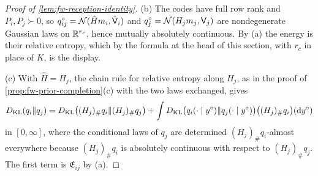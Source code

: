 \begin{proof}[Proof of \cref{lem:fw-reception-identity}]
(b) The codes have full row rank and $P_i,P_j\succ0$, so $q^\circ_{ij}=\mathcal{N}(\hat Hm_i,\hat{\mathsf V}_i)$ and $q^\circ_j=\mathcal{N}(H_jm_j,\mathsf V_j)$ are nondegenerate Gaussian laws on $\mathbb{R}^{r_c}$, hence mutually absolutely continuous. By (a) the energy is their relative entropy, which by the formula at the head of this section, with $r_c$ in place of $K$, is the display.

(c) With $\hat H=H_j$, the chain rule for relative entropy along $H_j$, as in the proof of \cref{prop:fw-prior-completion}(c) with the two laws exchanged, gives
\[
D_{\mathrm{KL}}(q_i\Vert q_j)=D_{\mathrm{KL}}\bigl((H_j)_\#q_i\Vert(H_j)_\#q_j\bigr)+\int D_{\mathrm{KL}}\bigl(q_i(\cdot\mid y^\circ)\Vert q_j(\cdot\mid y^\circ)\bigr)\bigl((H_j)_\#q_i\bigr)(\mathrm dy^\circ)
\]
in $[0,\infty]$, where the conditional laws of $q_j$ are determined $(H_j)_\#q_i$-almost everywhere because $(H_j)_\#q_i$ is absolutely continuous with respect to $(H_j)_\#q_j$. The first term is $\mathfrak E_{ij}$ by (a).
\end{proof}

